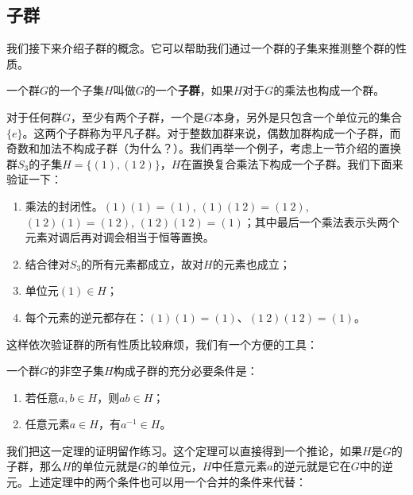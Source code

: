 \documentclass{article}
\begin{document}
\begin{Exercise}
\end{Exercise}

\subsection{子群}

我们接下来介绍子群的概念。它可以帮助我们通过一个群的子集来推测整个群的性质。

\begin{definition}
一个群$G$的一个子集$H$叫做$G$的一个\textbf{子群}，如果$H$对于$G$的乘法也构成一个群。
\end{definition}

对于任何群$G$，至少有两个子群，一个是$G$本身，另外是只包含一个单位元的集合$\{e\}$。这两个子群称为平凡子群。对于整数加群来说，偶数加群构成一个子群，而奇数和加法不构成子群（为什么？）。我们再举一个例子，考虑上一节介绍的置换群$S_3$的子集$H = \{(1), (1\ 2)\}$，$H$在置换复合乘法下构成一个子群。我们下面来验证一下：

\begin{enumerate}
\item 乘法的封闭性。$(1)(1) = (1)$, $(1)(1\ 2) = (1\ 2)$, $(1\ 2)(1) = (1\ 2)$, $(1\ 2) (1\ 2) = (1)$；其中最后一个乘法表示头两个元素对调后再对调会相当于恒等置换。
\item 结合律对$S_3$的所有元素都成立，故对$H$的元素也成立；
\item 单位元$(1) \in H$；
\item 每个元素的逆元都存在：$(1)(1) = (1)$、$(1\ 2) (1\ 2) = (1)$。
\end{enumerate}

这样依次验证群的所有性质比较麻烦，我们有一个方便的工具：

\begin{theorem}
一个群$G$的非空子集$H$构成子群的充分必要条件是：
\begin{enumerate}
\item 若任意$a, b \in H$，则$ab \in H$；
\item 任意元素$a \in H$，有$a^{-1} \in H$。
\end{enumerate}
\label{theorem:subgroup}
\end{theorem}

我们把这一定理的证明留作练习。这个定理可以直接得到一个推论，如果$H$是$G$的子群，那么$H$的单位元就是$G$的单位元，$H$中任意元素$a$的逆元就是它在$G$中的逆元。上述定理中的两个条件也可以用一个合并的条件来代替：
\end{document}
